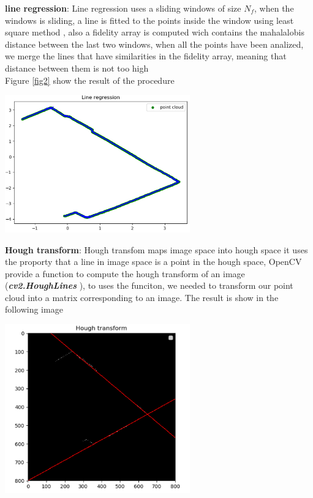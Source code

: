 \documentclass[11pt,a4paper]{report}
\begin{document}
\textbf{line regression}:
Line regression uses a sliding windows of size $N_{f}$, when the windows is sliding, a line is fitted to the points inside the window using least square method , also a fidelity array is computed wich contains the mahalalobis distance between the last two windows, when all the points have been analized, we merge the lines that have similarities in the fidelity array, meaning that  distance between them is not too high \\
Figure \ref{fig2} show the result of the procedure

\begin{center}\label{fig2}
	\includegraphics[width=8cm]{Capture2.png}
\end{center}

\textbf{Hough transform}:
Hough transfom maps image space into hough space it uses the proporty that a line in image space is a point in the hough space, OpenCV provide a function to compute the hough transform of an image (\textbf{\textit{cv2.HoughLines}} ), to uses the funciton, we needed to transform our point cloud into a matrix corresponding to an image.
The result is show in the following image 


\begin{center}\label{fig3}
	\includegraphics[width=8cm]{Capture3.png}
\end{center}
\end{document}
